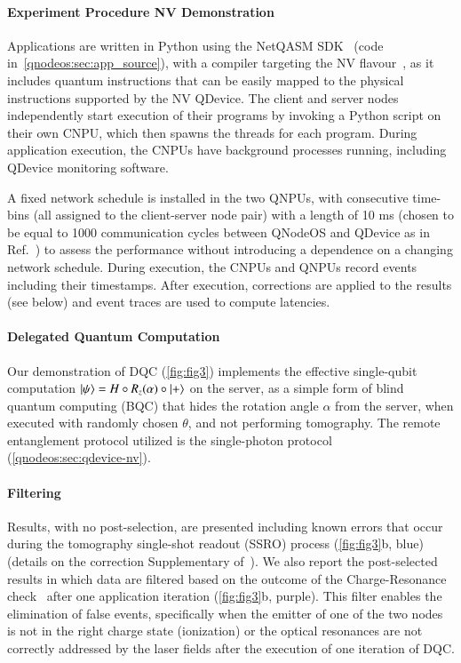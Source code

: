 \paragraph{Experiment Procedure NV Demonstration}

Applications are written in Python using the NetQASM SDK~\cite{dahlberg_2022_netqasm} (code in~\cref{qnodeos:sec:app_source}), with a compiler targeting the NV flavour~\cite{dahlberg_2022_netqasm}, as it includes quantum instructions that can be easily mapped to the physical instructions supported by the NV QDevice. The client and server nodes independently start execution of their programs by invoking a Python script on their own CNPU, which then spawns the threads for each program. During application execution, the CNPUs have background processes running, including QDevice monitoring software.

A fixed network schedule is installed in the two QNPUs, with consecutive time-bins (all assigned to the client-server node pair) with a length of 10 ms (chosen to be equal to 1000 communication cycles between QNodeOS and QDevice as in Ref.~\cite{pompili_2022_experimental}) to assess the performance without introducing a dependence on a changing network schedule.  During execution, the CNPUs and QNPUs record events including their timestamps. After execution, corrections are applied to the results (see below) and event traces are used to compute latencies.

\paragraph{Delegated Quantum Computation}

Our demonstration of DQC (\cref{fig:fig3}) implements the effective single-qubit computation $\ket{\psi} = H \circ R_z(\alpha) \circ \ket{+}$ on the server, as a simple form of blind quantum computing (BQC) that hides the rotation angle $\alpha$ from the server, when executed with randomly chosen $\theta$, and not performing tomography. The remote entanglement protocol utilized is the single-photon protocol~\cite{cabrillo1999creation,bose1999proposal,hermans2023entangling} (\cref{qnodeos:sec:qdevice-nv}).

\paragraph{Filtering}

Results, with no post-selection, are presented including known errors that occur during the tomography single-shot readout (SSRO) process (\cref{fig:fig3}b, blue) (details on the correction Supplementary of~\cite{pompili_2021_multinode}). We also report the post-selected results in which data are filtered based on the outcome of the Charge-Resonance check~\cite{robledo2010control} after one application iteration (\cref{fig:fig3}b, purple). This filter enables the elimination of false events, specifically when the emitter of one of the two nodes is not in the right charge state (ionization) or the optical resonances are not correctly addressed by the laser fields after the execution of one iteration of DQC.

